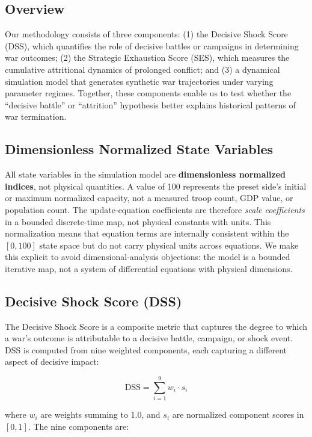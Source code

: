 \subsection{Overview}

Our methodology consists of three components: (1) the Decisive Shock Score (DSS), which quantifies the role of decisive battles or campaigns in determining war outcomes; (2) the Strategic Exhaustion Score (SES), which measures the cumulative attritional dynamics of prolonged conflict; and (3) a dynamical simulation model that generates synthetic war trajectories under varying parameter regimes. Together, these components enable us to test whether the ``decisive battle'' or ``attrition'' hypothesis better explains historical patterns of war termination.

\subsection{Dimensionless Normalized State Variables}

All state variables in the simulation model are \textbf{dimensionless normalized indices}, not physical quantities. A value of 100 represents the preset side's initial or maximum normalized capacity, not a measured troop count, GDP value, or population count. The update-equation coefficients are therefore \emph{scale coefficients} in a bounded discrete-time map, not physical constants with units. This normalization means that equation terms are internally consistent within the $[0, 100]$ state space but do not carry physical units across equations. We make this explicit to avoid dimensional-analysis objections: the model is a bounded iterative map, not a system of differential equations with physical dimensions.

\subsection{Decisive Shock Score (DSS)}

The Decisive Shock Score is a composite metric that captures the degree to which a war's outcome is attributable to a decisive battle, campaign, or shock event. DSS is computed from nine weighted components, each capturing a different aspect of decisive impact:

\begin{equation}
\text{DSS} = \sum_{i=1}^{9} w_i \cdot s_i
\label{eq:dss}
\end{equation}

\noindent where $w_i$ are weights summing to 1.0, and $s_i$ are normalized component scores in $[0, 1]$. The nine components are:

